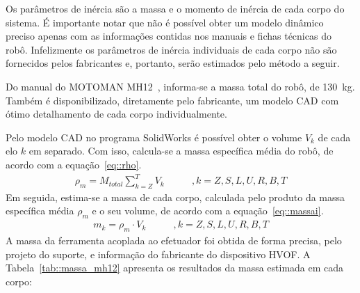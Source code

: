 Os parâmetros de inércia são a massa e o momento de inércia de cada corpo do
sistema. É importante notar que não é possível obter um modelo dinâmico preciso
apenas com as informações contidas nos manuais e fichas técnicas do robô.
Infelizmente os parâmetros de inércia individuais de cada corpo não são
fornecidos pelos fabricantes e, portanto, serão estimados pelo método a seguir.

Do manual do MOTOMAN MH12~\cite{manualmh12}, informa-se a massa total do robô,
de 130~kg. Também é disponibilizado, diretamente pelo fabricante, um modelo CAD
com ótimo detalhamento de cada corpo individualmente.

Pelo modelo CAD no programa SolidWorks é possível obter o volume $V_k$ de cada
elo $k$ em separado. Com isso, calcula-se a massa específica média do robô, de
acordo com a equação~\ref{eq::rho}.
%
\begin{align}
	\rho_{m} = M_{total}\sum_{k = Z}^{T} V_{k} \label{eq::rho} \qquad & ,
	k = Z,S,L,U,R,B,T
\end{align}
%
Em seguida, estima-se a massa de cada corpo, calculada pelo produto da massa
específica média $\rho_{m}$ e o seu volume, de acordo com a
equação~\ref{eq::massai}.
%
\begin{align}
	m_{k} = \rho_{m} \cdot V_{k} \label{eq::massai} \qquad &, k =
	Z,S,L,U,R,B,T
\end{align}
%
A massa da ferramenta acoplada ao efetuador foi obtida de forma precisa,
pelo projeto do suporte, e informação do fabricante do dispositivo
HVOF.
A Tabela~\ref{tab::massa_mh12} apresenta os resultados da massa estimada em cada
corpo:
%
